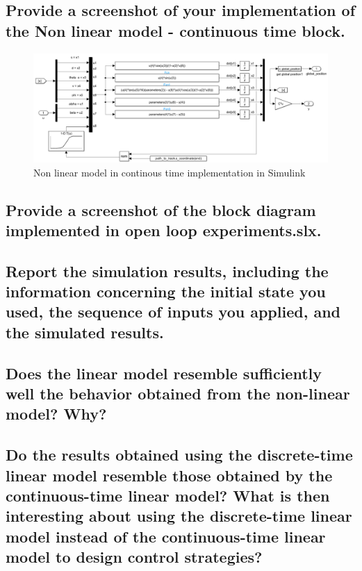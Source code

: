 \subsection{Provide a screenshot of your implementation of the Non linear model - continuous time block.}

\begin{figure}[H]
    \centering
    \includegraphics[width = 0.9\linewidth]{Latex report/image/nonLinModelContinousTime.png}
    \caption{Non linear model in continous time implementation in Simulink}
    \label{fig:continousTimeSimulink}
\end{figure}




\subsection{Provide a screenshot of the block diagram implemented in open loop experiments.slx.}






\subsection{Report the simulation results, including the information concerning the initial state you used, the sequence of inputs you applied, and the simulated results.}




\subsection{Does the linear model resemble sufficiently well the behavior obtained from the non-linear model? Why?}




\subsection{Do the results obtained using the discrete-time linear model resemble those obtained by the continuous-time linear model? What is then interesting about using the discrete-time linear model instead of the continuous-time linear model to design control strategies?}



